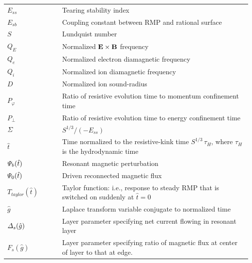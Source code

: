 \documentclass[12pt,prb,aps]{revtex4-1}
\begin{document}
\begin{tabular}{lll}
$E_{ss}$ &~~~& Tearing stability index\\[0.5ex]
$E_{sb}$ && Coupling constant between RMP and rational surface\\[0.5ex]
$S$ && Lundquist number\\[0.5ex]
$Q_E$ && Normalized ${\bf E}\times {\bf B}$ frequency\\[0.5ex]
$Q_e$ && Normalized electron diamagnetic  frequency\\[0.5ex]
$Q_i$ && Normalized ion diamagnetic frequency\\[0.5ex]
$D$ && Normalized ion sound-radius\\[0.5ex]
$P_\varphi$ && Ratio of resistive evolution time to momentum confinement time\\[0.5ex]
$P_\perp$ && Ratio of resistive evolution time to energy confinement time \\[0.5ex]
${\mit\Sigma}$ && $S^{1/3}/(-E_{ss})$\\[0.5ex]
$\hat{t}$ && Time normalized to the resistive-kink time $S^{1/3}\,\tau_H$, where $\tau_H$ is the hydrodynamic time\\[0.5ex]
${\mit\Psi}_b(\hat{t})$ && Resonant magnetic perturbation\\[0.5ex]
${\mit\Psi}_0(\hat{t})$ && Driven reconnected magnetic flux\\[0.5ex]
$T_{taylor}(\hat{t})$ && Taylor function: i.e., response to steady RMP that is switched on suddenly at $\hat{t}=0$\\[0.5ex]
$\hat{g}$ && Laplace transform variable conjugate to normalized time\\[0.5ex]
${\mit\Delta}_s(\hat{g})$ && Layer parameter specifying net current flowing in resonant layer\\[0.5ex]
$F_s(\hat{g})$ && Layer parameter specifying ratio of magnetic flux at center of  layer to that at edge.
\end{tabular}
\end{document}

